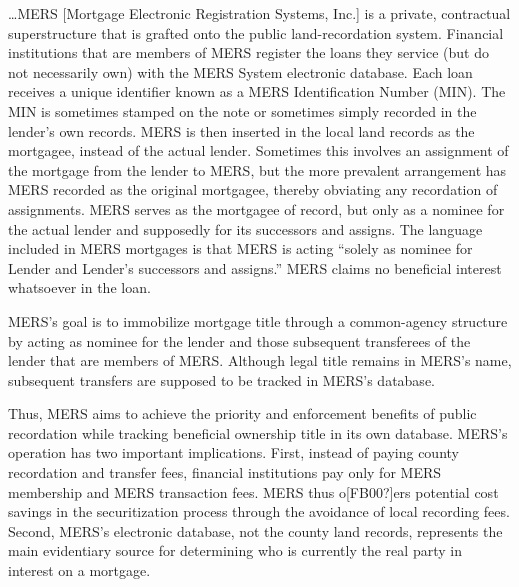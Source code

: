 

\dots MERS [Mortgage Electronic Registration Systems, Inc.] is a private,
contractual superstructure that is grafted onto the public land-recordation
system. Financial institutions that are members of MERS register the loans they
service (but do not necessarily own) with the MERS System electronic database.
Each loan receives a unique identifier known as a MERS Identification Number
(MIN). The MIN is sometimes stamped on the note or sometimes simply recorded in
the lender's own records. MERS is then inserted in the local land records as
the mortgagee, instead of the actual lender. Sometimes this involves an
assignment of the mortgage from the lender to MERS, but the more prevalent
arrangement has MERS recorded as the original mortgagee, thereby obviating any
recordation of assignments. MERS serves as the mortgagee of record, but only as
a nominee for the actual lender and supposedly for its successors and assigns.
The language included in MERS mortgages is that MERS is acting ``solely as
nominee for Lender and Lender's successors and assigns.'' MERS claims no
beneficial interest whatsoever in the loan.

MERS's goal is to immobilize mortgage title through a common-agency structure by
acting as nominee for the lender and those subsequent transferees of the lender
that are members of MERS. Although legal title remains in MERS's name,
subsequent transfers are supposed to be tracked in MERS's database.

Thus, MERS aims to achieve the priority and enforcement benefits of public
recordation while tracking beneficial ownership title in its own database.
MERS's operation has two important implications. First, instead of paying
county recordation and transfer fees, financial institutions pay only for MERS
membership and MERS transaction fees. MERS thus o[FB00?]ers potential cost
savings in the securitization process through the avoidance of local recording
fees. Second, MERS{}'s electronic database, not the county land records,
represents the main evidentiary source for determining who is currently the
real party in interest on a mortgage.

